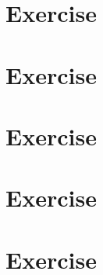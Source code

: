 \documentclass[a4paper]{article}
\begin{document}
\maketitle

\newpage
\tableofcontents
\newpage

\section{Exercise}


\section{Exercise}


\section{Exercise}


\section{Exercise}


\section{Exercise}

\end{document}
